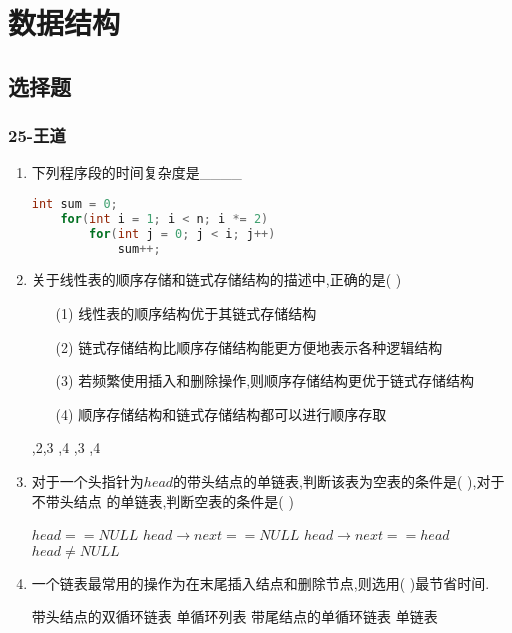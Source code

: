 \documentclass[12pt, a4paper, oneside, UTF8]{ctexbook}
\begin{document}
% 
\else
\fi
\chapter{数据结构}
\section{选择题}

\subsection{25-王道}
\begin{enumerate}
    \item \bt 下列程序段的时间复杂度是\_\_\_\_ 
    \begin{lstlisting}[language=C]
int sum = 0;
    for(int i = 1; i < n; i *= 2)
        for(int j = 0; j < i; j++)
            sum++;
    \end{lstlisting}


    \item 关于线性表的顺序存储和链式存储结构的描述中,正确的是(    ) 
    \begin{enumerate}
        \item [(1)] 线性表的顺序结构优于其链式存储结构
        \item [(2)] 链式存储结构比顺序存储结构能更方便地表示各种逻辑结构
        \item [(3)] 若频繁使用插入和删除操作,则顺序存储结构更优于链式存储结构
        \item [(4)] 顺序存储结构和链式存储结构都可以进行顺序存取 
    \end{enumerate}
    \begin{choices}
        ,2,3
        ,4
        ,3
        ,4
    \end{choices}

    \item 对于一个头指针为$head$的带头结点的单链表,判断该表为空表的条件是(   ),对于不带头结点
    的单链表,判断空表的条件是(   ) 
    \begin{choices}[2]
        \task $head == NULL$ 
        \task $head\rightarrow next == NULL$ 
        \task $head\rightarrow next == head$ 
        \task $head \neq NULL$
    \end{choices}


    \item 一个链表最常用的操作为在末尾插入结点和删除节点,则选用(   )最节省时间. 
    \begin{choices}[2]
        \task 带头结点的双循环链表
        \task 单循环列表
        \task 带尾结点的单循环链表
        \task 单链表
    \end{choices}


\end{enumerate}
\end{document}
